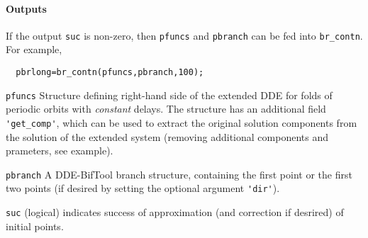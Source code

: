 \documentclass[11pt]{scrartcl}
\newcommand{\blist}[1]{\mbox{\lstinline!#1!}}
\begin{document}
\paragraph{Outputs}
If the output \blist{suc} is non-zero, then \blist{pfuncs} and \blist{pbranch} can be fed into \blist{br_contn}. For example,
\begin{lstlisting}
  pbrlong=br_contn(pfuncs,pbranch,100);
\end{lstlisting}
\begin{compactitem}
\item \blist{pfuncs} Structure defining right-hand side of the
  extended DDE for folds of periodic orbits with \emph{constant}
  delays. The structure has an additional field \blist{'get_comp'},
  which can be used to extract the original solution components from
  the solution of the extended system (removing additional components
  and prameters, see example).
\item \blist{pbranch} A DDE-BifTool branch structure, containing the
  first point or the first two points (if desired by setting the
  optional argument \blist{'dir'}).
\item \blist{suc} (logical) indicates success of approximation (and
  correction if desrired) of initial points.
\end{compactitem}
\end{document}
